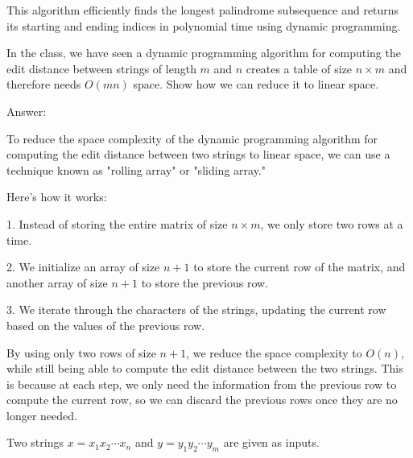 \documentclass{oxmathproblems}
\begin{document}
\begin{questions}
This algorithm efficiently finds the longest palindrome subsequence and returns its starting and ending indices in polynomial time using dynamic programming.

\miquestion[25]
In the class, we have seen a dynamic programming algorithm for computing the edit distance between strings of length $m$ and $n$ creates a table of size $n\times m$ and therefore needs $O(mn)$ space.
Show how we can reduce it to linear space.

Answer:

To reduce the space complexity of the dynamic programming algorithm for computing the edit distance between two strings to linear space, we can use a technique known as "rolling array" or "sliding array." 

Here's how it works:

1. Instead of storing the entire matrix of size $n \times m$, we only store two rows at a time.

2. We initialize an array of size $n+1$ to store the current row of the matrix, and another array of size $n+1$ to store the previous row.

3. We iterate through the characters of the strings, updating the current row based on the values of the previous row.

By using only two rows of size $n+1$, we reduce the space complexity to $O(n)$, while still being able to compute the edit distance between the two strings. This is because at each step, we only need the information from the previous row to compute the current row, so we can discard the previous rows once they are no longer needed.

\miquestion[25]
Two strings $x=x_1x_2\cdots x_n$ and $y=y_1y_2\cdots y_m$ are given as inputs.


\end{questions}
\end{document}
